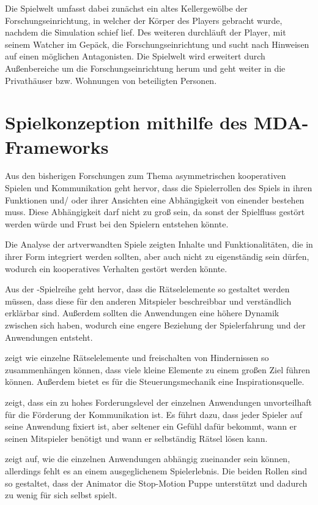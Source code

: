 Die Spielwelt umfasst dabei zunächst ein altes Kellergewölbe der Forschungseinrichtung, in welcher der Körper des Players gebracht wurde, nachdem die Simulation schief lief. Des weiteren durchläuft der Player, mit seinem Watcher im Gepäck, die Forschungseinrichtung und sucht nach Hinweisen auf einen möglichen Antagonisten. Die Spielwelt wird erweitert durch Außenbereiche um die Forschungseinrichtung herum und geht weiter in die Privathäuser bzw. Wohnungen von beteiligten Personen.

\section{Spielkonzeption mithilfe des MDA-Frameworks}
Aus den bisherigen Forschungen zum Thema asymmetrischen kooperativen Spielen und Kommunikation geht hervor, dass die Spielerrollen des Spiels in ihren Funktionen und/ oder ihrer Ansichten eine Abhängigkeit von einender bestehen muss. Diese Abhängigkeit darf nicht zu groß sein, da sonst der Spielfluss gestört werden würde und Frust bei den Spielern entstehen könnte.

Die Analyse der artverwandten Spiele zeigten Inhalte und Funktionalitäten, die in ihrer Form integriert werden sollten, aber auch nicht zu eigenständig sein dürfen, wodurch ein kooperatives Verhalten gestört werden könnte.

Aus der -Spielreihe geht hervor, dass die Rätselelemente so gestaltet werden müssen, dass diese für den anderen Mitspieler beschreibbar und verständlich erklärbar sind. Außerdem sollten die Anwendungen eine höhere Dynamik zwischen sich haben, wodurch eine engere Beziehung der Spielerfahrung und der Anwendungen entsteht. 

 zeigt wie einzelne Rätselelemente und freischalten von Hindernissen so zusammenhängen können, dass viele kleine Elemente zu einem großen Ziel führen können. Außerdem bietet es für die Steuerungsmechanik eine Inspirationsquelle. 

 zeigt, dass ein zu hohes Forderungslevel der einzelnen Anwendungen unvorteilhaft für die Förderung der Kommunikation ist. Es führt dazu, dass jeder Spieler auf seine Anwendung fixiert ist, aber seltener ein Gefühl dafür bekommt, wann er seinen Mitspieler benötigt und wann er selbständig Rätsel lösen kann. 

 zeigt auf, wie die einzelnen Anwendungen abhängig zueinander sein können, allerdings fehlt es an einem ausgeglichenem Spielerlebnis. Die beiden Rollen sind so gestaltet, dass der Animator die Stop-Motion Puppe unterstützt und dadurch zu wenig für sich selbst spielt. 

